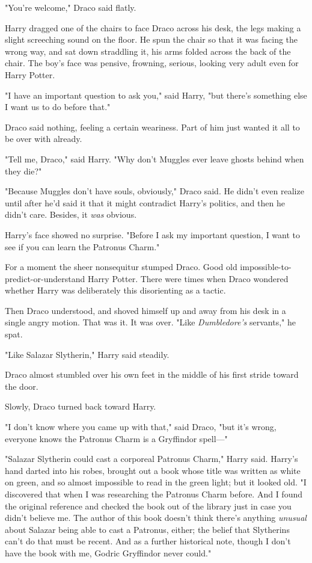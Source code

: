 "You’re welcome," Draco said flatly.

Harry dragged one of the chairs to face Draco across his desk, the legs making
a slight screeching sound on the floor. He spun the chair so that it was facing
the wrong way, and sat down straddling it, his arms folded across the back of
the chair. The boy’s face was pensive, frowning, serious, looking very adult
even for Harry Potter.

"I have an important question to ask you," said Harry, "but there’s something
else I want us to do before that."

Draco said nothing, feeling a certain weariness. Part of him just wanted it all
to be over with already.

"Tell me, Draco," said Harry. "Why don’t Muggles ever leave ghosts behind when
they die?"

"Because Muggles don’t have souls, obviously," Draco said. He didn’t even
realize until after he’d said it that it might contradict Harry’s politics, and
then he didn’t care. Besides, it \emph{was} obvious.

Harry’s face showed no surprise. "Before I ask my important question, I want to
see if you can learn the Patronus Charm."

For a moment the sheer nonsequitur stumped Draco. Good old
impossible-to-predict-or-understand Harry Potter. There were times when Draco
wondered whether Harry was deliberately this disorienting as a tactic.

Then Draco understood, and shoved himself up and away from his desk in a single
angry motion. That was it. It was over. "Like \emph{Dumbledore’s} servants," he
spat.

"Like Salazar Slytherin," Harry said steadily.

Draco almost stumbled over his own feet in the middle of his first stride
toward the door.

Slowly, Draco turned back toward Harry.

"I don’t know where you came up with that," said Draco, "but it’s wrong,
everyone knows the Patronus Charm is a Gryffindor spell—"

"Salazar Slytherin could cast a corporeal Patronus Charm," Harry said. Harry’s
hand darted into his robes, brought out a book whose title was written as white
on green, and so almost impossible to read in the green light; but it looked
old. "I discovered that when I was researching the Patronus Charm before. And I
found the original reference and checked the book out of the library just in
case you didn’t believe me. The author of this book doesn’t think there’s
anything \emph{unusual} about Salazar being able to cast a Patronus, either;
the belief that Slytherins can’t do that must be recent. And as a further
historical note, though I don’t have the book with me, Godric Gryffindor never
could."

